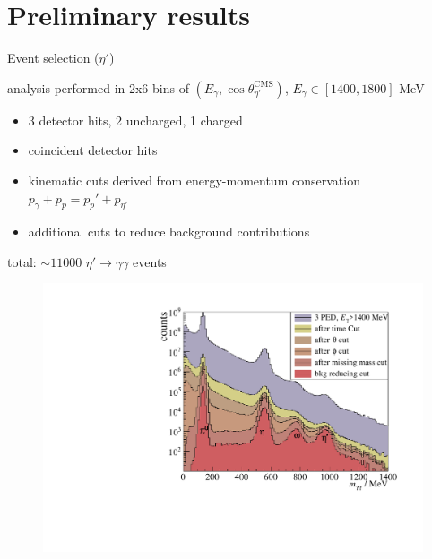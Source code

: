 \documentclass[11pt,aspectratio=169,dvipsnames]{beamer}
\begin{document}
\section{Preliminary results}
\begin{frame}{Event selection ($\eta'$)}


	\begin{minipage}{0.49\linewidth}
	analysis performed in 2x6 bins of $(E_\gamma,\cos\theta_{\eta'}^\text{CMS})$, $E_\gamma\in[1400,1800]$ MeV
	\begin{itemize}
		
		\item 3 detector hits, 2 uncharged, 1 charged
		\item coincident detector hits
		\item kinematic cuts derived from energy-momentum conservation $p_\gamma + p_p = p_p'+p_{\eta'}$
		\item additional cuts to reduce background contributions
	\end{itemize}
total: $\sim 11000$ $\eta'\to\gamma\gamma$ events
		\end{minipage}
	\begin{minipage}{.5\linewidth}
		\begin{figure}
			\centering
			\includegraphics[width=1.05\linewidth]{figs/inv_mass_pretty.pdf}
		\end{figure}
	\end{minipage}




\end{frame}
\end{document}
